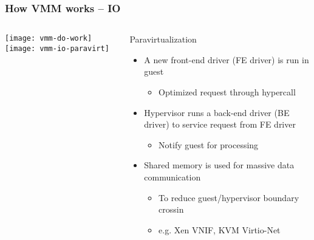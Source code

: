 \begin{frame}[plain]
	\frametitle{How VMM works -- IO}
	
	
	
	\begin{columns}
		
		\begin{column}{.4\textwidth}
			\centering
			\texttt{[image: vmm-do-work]}
			\texttt{[image: vmm-io-paravirt]}
		\end{column}
		
		\begin{column}{.6\textwidth}
			Paravirtualization
			\begin{itemize}
				\item A new front-end driver (FE driver) is run in guest
				\begin{itemize}
					\item Optimized request through hypercall
					
				\end{itemize} 
			
				\item Hypervisor runs a back-end driver (BE driver) to service request from FE driver
				\begin{itemize}
					\item Notify guest for processing
	
				\end{itemize} 			
			
			\item Shared memory is used for massive data communication
			\begin{itemize}
				\item To reduce guest/hypervisor boundary crossin
				\item e.g. Xen VNIF, KVM Virtio-Net
			\end{itemize} 
			
			\end{itemize} 	
			
			
		\end{column}
		
		
	\end{columns}
	
	
\end{frame}


